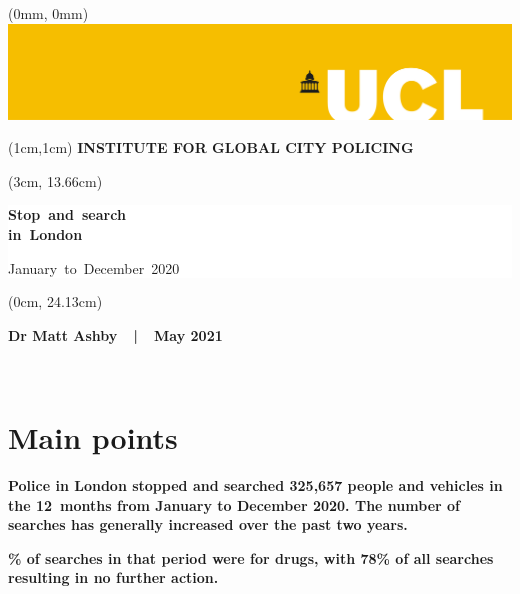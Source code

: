 \documentclass[
  a4paper,
  twoside, 11pt]{article}
\begin{document}
\begin{textblock*}{21cm}(0mm, 0mm)
\includegraphics[width=21cm]{ucl-banner-port-yellow-rgb-lg.png}
\end{textblock*}

\begin{textblock*}{21cm}(1cm,1cm)
\textbf{\sffamily INSTITUTE FOR GLOBAL CITY POLICING}
\end{textblock*}

\begin{textblock*}{18cm}(3cm, 13.66cm)
\raggedright \sffamily
\begin{singlespace}
\colorbox{white}{\hspace{1cm}\parbox[c][5.9cm]{16cm}{
{\fontsize{40}{32}\selectfont \bfseries \mbox{Stop and search}\\\mbox{in London}
\vspace{6pt}}

{\fontsize{40}{32}\selectfont \mbox{January to December 2020} }

}\hspace{1cm}}
\end{singlespace}
\end{textblock*}

\begin{textblock*}{11.43cm}(0cm, 24.13cm)
\colorbox{uclyellow}{\parbox[c][2.63cm]{\textwidth}{
\centering \bfseries \sffamily \fontsize{16}{16}\selectfont 
Dr Matt Ashby\ \ |\ \ May 2021
}}
\end{textblock*}

~

\thispagestyle{empty}
\newpage

\hypertarget{main-points}{%
\section{Main points}\label{main-points}}

\textbf{\sffamily Police in London stopped and searched 325,657 people and vehicles in the 12~months from January to December 2020. The number of searches has generally increased over the past two years.}

\textbf{\% of searches in that period were for drugs, with 78\% of all searches resulting in no further action.}
\end{document}
